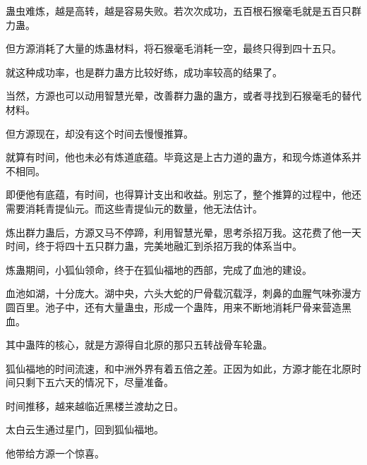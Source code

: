 \begin{this_body}
蛊虫难炼，越是高转，越是容易失败。若次次成功，五百根石猴毫毛就是五百只群力蛊。

但方源消耗了大量的炼蛊材料，将石猴毫毛消耗一空，最终只得到四十五只。

就这种成功率，也是群力蛊方比较好练，成功率较高的结果了。

当然，方源也可以动用智慧光晕，改善群力蛊的蛊方，或者寻找到石猴毫毛的替代材料。

但方源现在，却没有这个时间去慢慢推算。

就算有时间，他也未必有炼道底蕴。毕竟这是上古力道的蛊方，和现今炼道体系并不相同。

即便他有底蕴，有时间，也得算计支出和收益。别忘了，整个推算的过程中，他还需要消耗青提仙元。而这些青提仙元的数量，他无法估计。

炼出群力蛊后，方源又马不停蹄，利用智慧光晕，思考杀招万我。这花费了他一天时间，终于将四十五只群力蛊，完美地融汇到杀招万我的体系当中。

炼蛊期间，小狐仙领命，终于在狐仙福地的西部，完成了血池的建设。

血池如湖，十分庞大。湖中央，六头大蛇的尸骨载沉载浮，刺鼻的血腥气味弥漫方圆百里。池子中，还有大量蛊虫，形成一个蛊阵，用来不断地消耗尸骨来营造黑血。

其中蛊阵的核心，就是方源得自北原的那只五转战骨车轮蛊。

狐仙福地的时间流速，和中洲外界有着五倍之差。正因为如此，方源才能在北原时间只剩下五六天的情况下，尽量准备。

时间推移，越来越临近黑楼兰渡劫之日。

太白云生通过星门，回到狐仙福地。

他带给方源一个惊喜。

\end{this_body}

